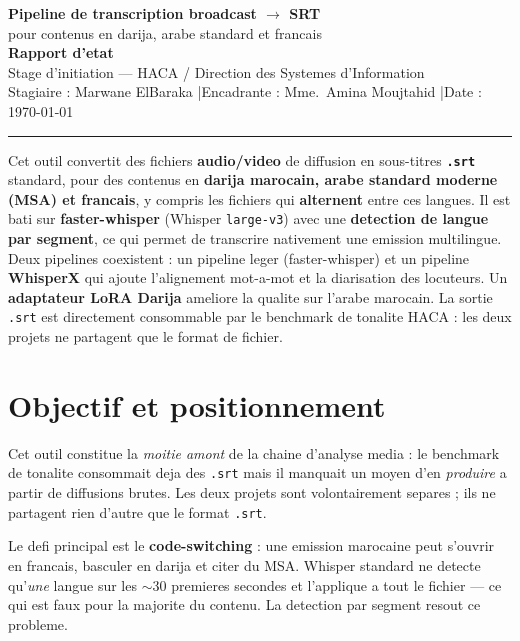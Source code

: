 \documentclass[11pt, a4paper]{article}
\begin{document}
\begin{center}
  {\LARGE\bfseries\color{hacablue} Pipeline de transcription broadcast $\rightarrow$ SRT}\\[3pt]
  {\large pour contenus en darija, arabe standard et francais}\\[8pt]
  {\normalsize \textbf{Rapport d'etat}}\\[4pt]
  {\small Stage d'initiation — HACA / Direction des Systemes d'Information}\\[1pt]
  {\small Stagiaire : Marwane ElBaraka \quad|\quad Encadrante : Mme.~Amina Moujtahid \quad|\quad Date : \today}
\end{center}

\vspace{2pt}\rule{\linewidth}{0.8pt}\vspace{6pt}

\begin{resume}
Cet outil convertit des fichiers \textbf{audio/video} de diffusion en sous-titres
\textbf{\texttt{.srt}} standard, pour des contenus en \textbf{darija marocain, arabe
standard moderne (MSA) et francais}, y compris les fichiers qui \textbf{alternent} entre
ces langues. Il est bati sur \textbf{faster-whisper} (Whisper \texttt{large-v3}) avec une
\textbf{detection de langue par segment}, ce qui permet de transcrire nativement une
emission multilingue. Deux pipelines coexistent : un pipeline leger (faster-whisper) et
un pipeline \textbf{WhisperX} qui ajoute l'alignement mot-a-mot et la diarisation des
locuteurs. Un \textbf{adaptateur LoRA Darija} ameliore la qualite sur l'arabe marocain.
La sortie \texttt{.srt} est directement consommable par le benchmark de tonalite HACA :
les deux projets ne partagent que le format de fichier.
\end{resume}

\section{Objectif et positionnement}

Cet outil constitue la \emph{moitie amont} de la chaine d'analyse media : le benchmark de
tonalite consommait deja des \texttt{.srt} mais il manquait un moyen d'en \emph{produire}
a partir de diffusions brutes. Les deux projets sont volontairement separes ; ils ne
partagent rien d'autre que le format \texttt{.srt}.

Le defi principal est le \textbf{code-switching} : une emission marocaine peut s'ouvrir
en francais, basculer en darija et citer du MSA. Whisper standard ne detecte qu'\emph{une}
langue sur les $\sim$30 premieres secondes et l'applique a tout le fichier — ce qui est
faux pour la majorite du contenu. La detection par segment resout ce probleme.
\end{document}
